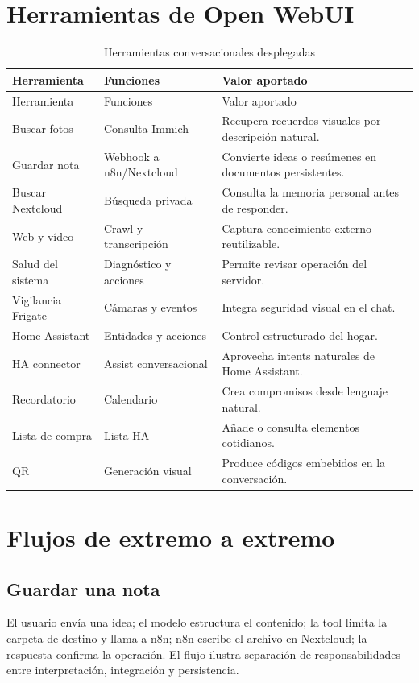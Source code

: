 \section{Herramientas de Open WebUI}
\begin{longtable}{p{}p{}p{}}
  \caption{Herramientas conversacionales desplegadas}
  \label{tab:tools-seguimiento}\\
  \toprule
  Herramienta & Funciones & Valor aportado \\
  \midrule
  \endfirsthead
  \toprule
  Herramienta & Funciones & Valor aportado \\
  \midrule
  \endhead
  \bottomrule
  \endfoot
  Buscar fotos & Consulta Immich & Recupera recuerdos visuales por descripción natural. \\
  Guardar nota & Webhook a n8n/Nextcloud & Convierte ideas o resúmenes en documentos persistentes. \\
  Buscar Nextcloud & Búsqueda privada & Consulta la memoria personal antes de responder. \\
  Web y vídeo & Crawl y transcripción & Captura conocimiento externo reutilizable. \\
  Salud del sistema & Diagnóstico y acciones & Permite revisar operación del servidor. \\
  Vigilancia Frigate & Cámaras y eventos & Integra seguridad visual en el chat. \\
  Home Assistant & Entidades y acciones & Control estructurado del hogar. \\
  HA connector & Assist conversacional & Aprovecha intents naturales de Home Assistant. \\
  Recordatorio & Calendario & Crea compromisos desde lenguaje natural. \\
  Lista de compra & Lista HA & Añade o consulta elementos cotidianos. \\
  QR & Generación visual & Produce códigos embebidos en la conversación. \\
\end{longtable}

\section{Flujos de extremo a extremo}
\subsection{Guardar una nota}
El usuario envía una idea; el modelo estructura el contenido; la tool limita la carpeta de destino y llama a n8n; n8n escribe el archivo en Nextcloud; la respuesta confirma la operación. El flujo ilustra separación de responsabilidades entre interpretación, integración y persistencia.

